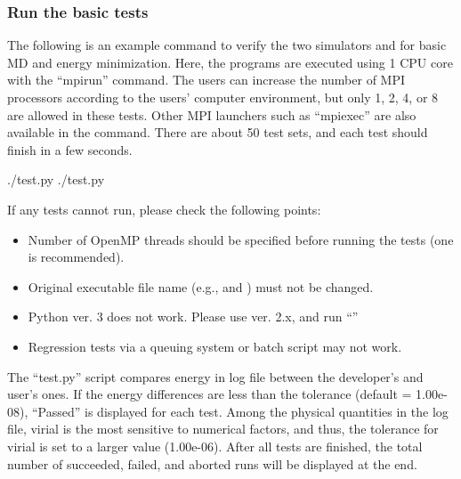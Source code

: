 \documentclass[a4paper,11pt,oneside,english]{sphinxmanual}
\begin{document}
\subsubsection{Run the basic tests}
\label{\detokenize{01_Getting_Started:run-the-basic-tests}}
The following is an example command to verify the two simulators
 and  for basic MD and energy minimization.
Here, the programs are executed using 1 CPU core with the “mpirun” command.
The users can increase the number of MPI processors according to
the users’ computer environment, but only 1, 2, 4, or 8 are allowed in these tests.
Other MPI launchers such as “mpiexec” are also available in the command.
There are about 50 test sets, and each test should finish in a few seconds.

\begin{sphinxVerbatim}[commandchars=\\\{\}]
\PYGZdl{}  
\PYGZdl{} ./test.py 
\PYGZdl{} ./test.py 
\end{sphinxVerbatim}

If any tests cannot run, please check the following points:
\begin{itemize}
\item {} 
Number of OpenMP threads should be specified before running the tests (one is recommended).

\item {} 
Original executable file name (e.g.,  and ) must not be changed.

\item {} 
Python ver. 3 does not work. Please use ver. 2.x, and run “”

\item {} 
Regression tests via a queuing system or batch script may not work.

\end{itemize}

The “test.py” script compares energy in log file between the developer’s and user’s ones.
If the energy differences are less than the tolerance (default = 1.00e-08),
“Passed” is displayed for each test. Among the physical quantities in the log file,
virial is the most sensitive to numerical factors, and thus, the tolerance
for virial is set to a larger value (1.00e-06).
After all tests are finished, the total number of succeeded,
failed, and aborted runs will be displayed at the end.
\end{document}
